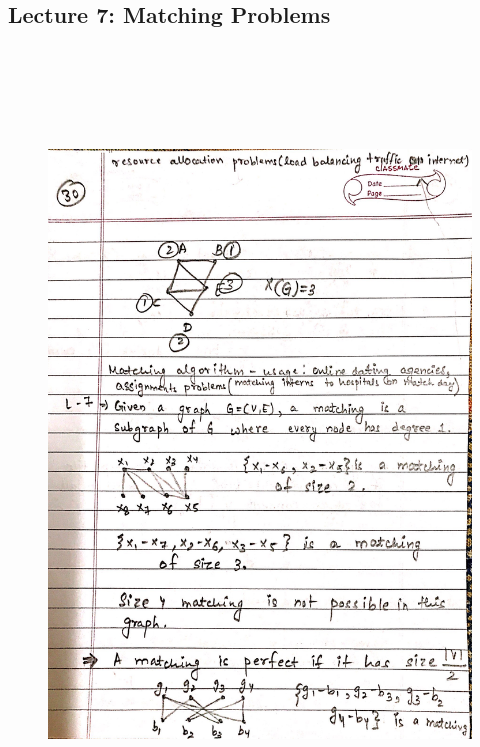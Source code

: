 \newpage
{\color{black} \subsection*{Lecture 7: Matching Problems}}
\begin{figure}[H]
    \centering
    \includegraphics[width=16cm, height=21cm]{"./MIT-6.042J/MIT-6042J-030"}
\end{figure}


